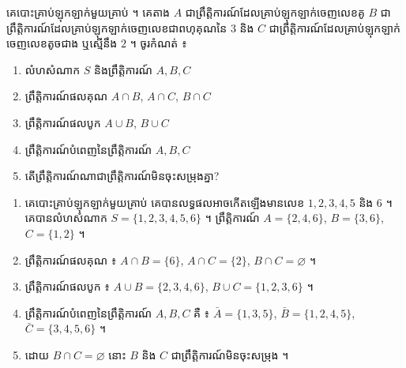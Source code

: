 \begin{example}[លំហាត់គំរូ]
គេបោះគ្រាប់ឡុកឡាក់មួយគ្រាប់ ។ គេតាង $A$ ជាព្រឹត្តិការណ៍ដែលគ្រាប់ឡុកឡាក់ចេញលេខគូ $B$ ជាព្រឹត្តិការណ៍ដែលគ្រាប់ឡុកឡាក់ចេញលេខជាពហុគុណនៃ $3$ និង $C$ ជាព្រឹត្តិការណ៍ដែលគ្រាប់ឡុកឡាក់ចេញលេខតូចជាង ឬស្មើនឹង $2$ ។ ចូរកំណត់ ៖
\begin{enumerate}[a]
  \item លំហសំណាក $S$ និងព្រឹត្តិការណ៍ $A, B, C$
  \item ព្រឹត្តិការណ៍ផលគុណ $A \cap B$, $A \cap C$, $B \cap C$
  \item ព្រឹត្តិការណ៍ផលបូក $A \cup B$, $B \cup C$
  \item ព្រឹត្តិការណ៍បំពេញនៃព្រឹត្តិការណ៍ $A, B, C$
  \item តើព្រឹត្តិការណ៍ណាជាព្រឹត្តិការណ៍មិនចុះសម្រុងគ្នា?
\end{enumerate}
\ans
\begin{enumerate}[a]
  \item គេបោះគ្រាប់ឡុកឡាក់មួយគ្រាប់ គេបានលទ្ធផលអាចកើតឡើងមានលេខ $1, 2, 3, 4, 5$ និង $6$ ។ គេបានលំហសំណាក $S = \{1, 2, 3, 4, 5, 6\}$ ។ ព្រឹត្តិការណ៍ $A = \{2, 4, 6\}$, $B = \{3, 6\}$, $C = \{1, 2\}$ ។
  \item ព្រឹត្តិការណ៍ផលគុណ ៖ $A \cap B = \{6\}$, $A \cap C = \{2\}$, $B \cap C = \varnothing$ ។
  \item ព្រឹត្តិការណ៍ផលបូក ៖ $A \cup B = \{2, 3, 4, 6\}$, $B \cup C = \{1, 2, 3, 6\}$ ។
  \item ព្រឹត្តិការណ៍បំពេញនៃព្រឹត្តិការណ៍ $A, B, C$ គឺ ៖ $\bar{A} = \{1, 3, 5\}$, $\bar{B} = \{1, 2, 4, 5\}$, $\bar{C} = \{3, 4, 5, 6\}$ ។
  \item ដោយ $B \cap C = \varnothing$ នោះ $B$ និង $C$ ជាព្រឹត្តិការណ៍មិនចុះសម្រុង ។
\end{enumerate}
\end{example}

